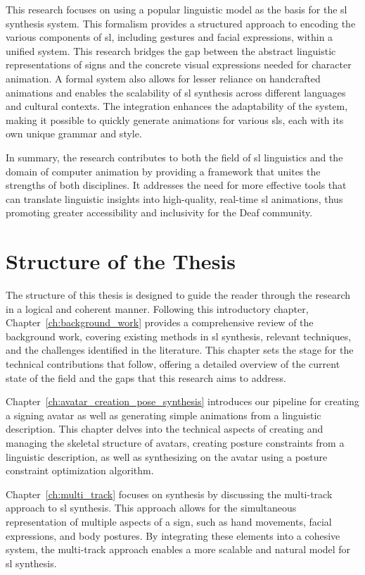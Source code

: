 \documentclass[../../main.tex]{subfiles}
\begin{document}
This research focuses on using a popular linguistic model as the basis for the \gls{sl} synthesis system. This formalism provides a structured approach to encoding the various components of \gls{sl}, including gestures and facial expressions, within a unified system. This research bridges the gap between the abstract linguistic representations of signs and the concrete visual expressions needed for character animation. A formal system also allows for lesser reliance on handcrafted animations and enables the scalability of \gls{sl} synthesis across different languages and cultural contexts. The integration enhances the adaptability of the system, making it possible to quickly generate animations for various \gls{sl}s, each with its own unique grammar and style.

In summary, the research contributes to both the field of \gls{sl} linguistics and the domain of computer animation by providing a framework that unites the strengths of both disciplines. It addresses the need for more effective tools that can translate linguistic insights into high-quality, real-time \gls{sl} animations, thus promoting greater accessibility and inclusivity for the Deaf community.

\section{Structure of the Thesis}
\label{ch:introduction:structure}

The structure of this thesis is designed to guide the reader through the research in a logical and coherent manner. Following this introductory chapter, Chapter~\ref{ch:background_work} provides a comprehensive review of the background work, covering existing methods in \gls{sl} synthesis, relevant techniques, and the challenges identified in the literature. This chapter sets the stage for the technical contributions that follow, offering a detailed overview of the current state of the field and the gaps that this research aims to address.

Chapter~\ref{ch:avatar_creation_pose_synthesis} introduces our pipeline for creating a signing avatar as well as generating simple animations from a linguistic description. This chapter delves into the technical aspects of creating and managing the skeletal structure of avatars, creating posture constraints from a linguistic description, as well as synthesizing on the avatar using a posture constraint optimization algorithm.

Chapter~\ref{ch:multi_track} focuses on synthesis by discussing the multi-track approach to \gls{sl} synthesis. This approach allows for the simultaneous representation of multiple aspects of a sign, such as hand movements, facial expressions, and body postures. By integrating these elements into a cohesive system, the multi-track approach enables a more scalable and natural model for \gls{sl} synthesis.
\end{document}
